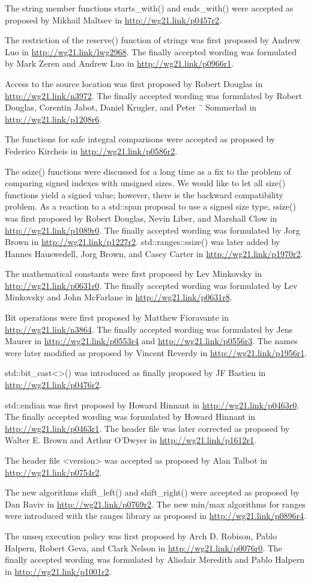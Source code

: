 The string member functions starts\_with() and ends\_with() were accepted as proposed by Mikhail Maltsev in \url{http://wg21.link/p0457r2}.

The restriction of the reserve() function of strings was first proposed by Andrew Luo in \url{http://wg21.link/lwg2968}. The finally accepted wording was formulated by Mark Zeren and Andrew Luo in \url{http://wg21.link/p0966r1}.

Access to the source location was first proposed by Robert Douglas in \url{http://wg21.link/n3972}. The finally accepted wording was formulated by Robert Douglas, Corentin Jabot, Daniel Krugler, and Peter ¨ Sommerlad in \url{http://wg21.link/p1208r6}.

The functions for safe integral comparisons were accepted as proposed by Federico Kircheis in \url{http://wg21.link/p0586r2}.

The ssize() functions were discussed for a long time as a fix to the problem of comparing signed indexes with unsigned sizes. We would like to let all size() functions yield a signed value; however, there is the backward compatibility problem. As a reaction to a std::span proposal to use a signed size type, ssize() was first proposed by Robert Douglas, Nevin Liber, and Marshall Clow in \url{http://wg21.link/p1089r0}. The finally accepted wording was formulated by Jorg Brown in \url{http://wg21.link/p1227r2}. std::ranges::ssize() was later added by Hannes Hauswedell, Jorg Brown, and Casey Carter in \url{http://wg21.link/p1970r2}.

The mathematical constants were first proposed by Lev Minkovsky in \url{http://wg21.link/p0631r0}. The finally accepted wording was formulated by Lev Minkovsky and John McFarlane in \url{http://wg21.link/p0631r8}.

Bit operations were first proposed by Matthew Fioravante in \url{http://wg21.link/n3864}. The finally accepted wording was formulated by Jens Maurer in \url{http://wg21.link/p0553r4} and \url{http://wg21.link/p0556r3}. The names were later modified as proposed by Vincent Reverdy in \url{http://wg21.link/p1956r1}.

std::bit\_cast<>() was introduced as finally proposed by JF Bastien in \url{http://wg21.link/p0476r2}.

std::endian was first proposed by Howard Hinnant in \url{http://wg21.link/p0463r0}. The finally accepted wording was formulated by Howard Hinnant in \url{http://wg21.link/p0463r1}. The header file was later corrected as proposed by Walter E. Brown and Arthur O’Dwyer in \url{http://wg21.link/p1612r1}.

The header file <version> was accepted as proposed by Alan Talbot in \url{http://wg21.link/p0754r2}.

The new algorithms shift\_left() and shift\_right() were accepted as proposed by Dan Raviv in \url{http://wg21.link/p0769r2}. The new min/max algorithms for ranges were introduced with the ranges library as proposed in \url{http://wg21.link/p0896r4}.

The unseq execution policy was first proposed by Arch D. Robison, Pablo Halpern, Robert Geva, and Clark Nelson in \url{http://wg21.link/p0076r0}. The finally accepted wording was formulated by Alisdair Meredith and Pablo Halpern in \url{http://wg21.link/p1001r2}.
